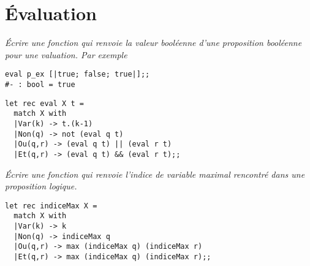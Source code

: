 \section{Évaluation}
\begin{Exercise}\it
Écrire une fonction  qui renvoie la valeur booléenne d'une proposition booléenne pour une valuation. Par exemple
\begin{lstlisting}
eval p_ex [|true; false; true|];;
#- : bool = true
\end{lstlisting}
\end{Exercise}
\begin{Answer}
\begin{lstlisting}
let rec eval X t =
  match X with
  |Var(k) -> t.(k-1)
  |Non(q) -> not (eval q t)
  |Ou(q,r) -> (eval q t) || (eval r t)
  |Et(q,r) -> (eval q t) && (eval r t);;
\end{lstlisting}
\newpage
\end{Answer}
\begin{Exercise}\it
Écrire une fonction  qui renvoie l’indice de variable maximal rencontré dans une proposition logique.
\end{Exercise}
\begin{Answer}
\begin{lstlisting}
let rec indiceMax X =
  match X with
  |Var(k) -> k
  |Non(q) -> indiceMax q
  |Ou(q,r) -> max (indiceMax q) (indiceMax r)
  |Et(q,r) -> max (indiceMax q) (indiceMax r);;
\end{lstlisting}
\end{Answer}
\medskip


